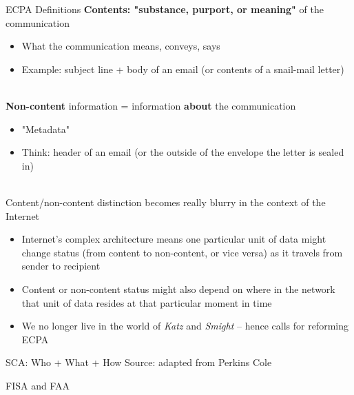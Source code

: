 \documentclass[nobackground,dvipsnames,table]{beamer}
\begin{document}
\begin{frame}{ECPA Definitions}
    \textbf{Contents: "substance, purport, or meaning"} of the communication
    \begin{itemize}
        \item What the communication means, conveys, says
        \item Example: subject line + body of an email (or contents of a snail-mail letter)\\~\\
    \end{itemize}

    \textbf{Non-content} information = information \textbf{about} the communication
    \begin{itemize}
        \item "Metadata"
        \item Think: header of an email (or the outside of the envelope the letter is sealed in)\\~\\
    \end{itemize}
    
    Content/non-content distinction becomes really blurry in the context of the Internet
    \begin{itemize}
        \item Internet's complex architecture means one particular unit of data might change status (from content to non-content, or vice versa) as it travels from sender to recipient
        \item Content or non-content status might also depend on where in the network that unit of data resides at that particular moment in time
        \item We no longer live in the world of \textit{Katz} and \textit{Smight} -- hence calls for reforming ECPA
    \end{itemize}
\end{frame}

\begin{frame}{SCA: Who + What + How}
    \tiny
    Source: adapted from Perkins Cole
\end{frame}

\begin{frame}{}
    \thispagestyle{empty}
\end{frame}

\begin{frame}{FISA and FAA}
\end{frame}
\end{document}

